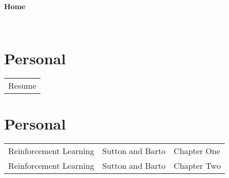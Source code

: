 \documentclass[11pt]{article}
\begin{document}
~
~

\begin{center}
  {
	\fontsize{1.5cm}{1.5cm}
        \textcolor{CalPolyGreen}{\textbf{Home}}
  }

\end{center}

~
~


\section*{\textcolor{CalPolyGreen}{Personal}}
\begin{tabular}{l}
	Resume
\end{tabular}

\section*{\textcolor{CalPolyGreen}{Personal}}
\begin{tabular}{lll}
	Reinforcement Learning	& Sutton and Barto  & Chapter One   \\
	Reinforcement Learning	& Sutton and Barto  & Chapter Two   \\
\end{tabular}
\end{document}
